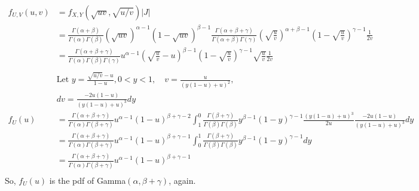 \documentclass[letterpaper]{article}
\begin{document}
\begin{enumerate}[(a)]
    \begin{align*}
    f_{U,V}(u,v) & = f_{X,Y}(\sqrt{uv}, \sqrt{u/v})|J| \\
    & = \frac{\Gamma(\alpha+\beta)}{\Gamma(\alpha)\Gamma(\beta)} (\sqrt{uv})^{\alpha-1}(1-\sqrt{uv})^{\beta-1} \frac{\Gamma(\alpha+\beta+\gamma)}{\Gamma(\alpha+\beta)\Gamma(\gamma)}\left(\sqrt{\frac{u}{v}}\right)^{\alpha+\beta-1}\left(1-\sqrt{\frac{u}{v}}\right)^{\gamma-1} \frac{1}{2v} \\
    & = \frac{\Gamma(\alpha+\beta+\gamma)}{\Gamma(\alpha)\Gamma(\beta)\Gamma(\gamma)} u^{\alpha-1} \left(\sqrt{\frac{u}{v}} -u\right)^{\beta-1} \left(1-\sqrt{\frac{u}{v}}\right)^{\gamma-1} \sqrt{\frac{u}{v}} \frac{1}{2v}\\
    \\
    & \text{Let $y = \frac{\sqrt{u/v}-u}{1-u}, 0 < y < 1, \quad v = \frac{u}{(y(1-u)+u)^2}$},\\
    & dv = \frac{-2u(1-u)}{(y(1-u)+u)^3} dy \\
    f_U(u) & = \frac{\Gamma(\alpha+\beta+\gamma)}{\Gamma(\alpha)\Gamma(\beta+\gamma)} u^{\alpha-1} (1-u)^{\beta+\gamma-2} \int_1^0 \frac{\Gamma(\beta+\gamma)}{\Gamma(\beta)\Gamma(\beta)} y^{\beta-1} (1-y)^{\gamma-1} \frac{(y(1-u)+u)^3}{2u} \frac{-2u(1-u)}{(y(1-u)+u)^3} dy \\
    & = \frac{\Gamma(\alpha+\beta+\gamma)}{\Gamma(\alpha)\Gamma(\beta+\gamma)} u^{\alpha-1} (1-u)^{\beta+\gamma-1} \int_0^1 \frac{\Gamma(\beta+\gamma)}{\Gamma(\beta)\Gamma(\beta)} y^{\beta-1} (1-y)^{\gamma-1} dy \\
    & = \frac{\Gamma(\alpha+\beta+\gamma)}{\Gamma(\alpha)\Gamma(\beta+\gamma)} u^{\alpha-1} (1-u)^{\beta+\gamma-1}\\
    \end{align*}
    So, $f_U(u)$ is the pdf of Gamma$(\alpha, \beta+\gamma)$, again.
    \end{enumerate}
\end{document}
